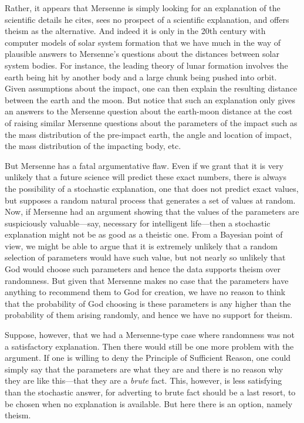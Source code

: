 Rather, it appears that Mersenne is simply looking for an explanation of the scientific details he cites, sees no
prospect of a scientific explanation, and offers theism as the alternative. And indeed it is only in the 20th century
with computer models of solar system formation that we have much in the way of plausible answers to Mersenne's questions
about the distances between solar system bodies. For instance, the leading theory of lunar formation involves the earth being hit by
another body and a large chunk being pushed into orbit. Given assumptions about the impact, one can then explain the
resulting distance between the earth and the moon. But notice that such an explanation only gives an answers to the 
Mersenne question about the earth-moon distance at the cost of raising similar Mersenne questions about the 
parameters of the impact such as the mass distribution of the pre-impact earth, the angle and location of impact, the 
mass distribution of the impacting body, etc.

But Mersenne has a fatal argumentative flaw. Even if we grant that it is very unlikely that a future science will predict
these exact numbers, there is always the possibility of a stochastic explanation, one that does not predict exact values, 
but supposes a random natural process that generates a set of values at random. Now, if Mersenne had an argument showing
that the values of the parameters are suspiciously valuable---say, necessary for intelligent life---then a stochastic
explanation might not be as good as a theistic one. From a Bayesian point of view, we might be able to argue that it is
extremely unlikely that a random selection of parameters would have such value, but not nearly so unlikely that God would
choose such parameters and hence the data supports theism over randomness. But given that Mersenne makes no case that 
the parameters have anything to recommend them to God for creation, we have no reason to think that the probability of God 
choosing is these parameters is any higher than the probability of them arising randomly, and hence we have no support for
theism.

Suppose, however, that we had a Mersenne-type case where randomness was not a satisfactory explanation. Then there would
still be one more problem with the argument. If one is willing to deny the Principle of Sufficient Reason, one could simply
say that the parameters are what they are and there is no reason why they are like this---that they are a \textit{brute} fact.
This, however, is less satisfying than the stochastic answer, for adverting to brute fact should be a last resort, to be
chosen when no explanation is available. But here there is an option, namely theism.

